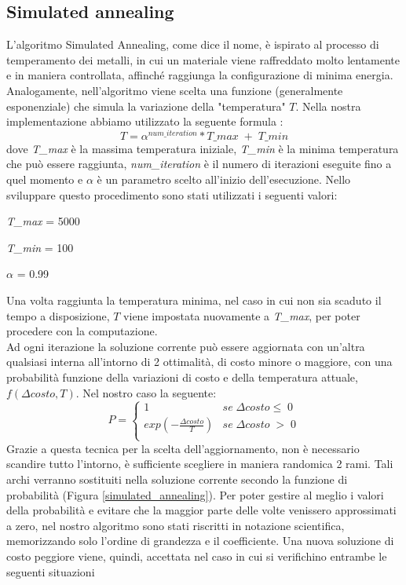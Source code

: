 \subsection{Simulated annealing}
L'algoritmo Simulated Annealing, come dice il nome, è ispirato al processo di temperamento dei metalli, in cui un materiale viene raffreddato molto lentamente e in maniera controllata, affinché raggiunga la configurazione di minima energia. Analogamente, nell'algoritmo viene scelta una funzione (generalmente esponenziale) che simula la variazione della "temperatura" $T$. Nella nostra implementazione abbiamo utilizzato la seguente formula \cite{SA}:
$$T = \alpha^{num\_iteration}* T\_max \;+\; T\_min$$
dove \textit{T\_max} è la massima temperatura iniziale, \textit{T\_min} è la minima temperatura che può essere raggiunta, \textit{num\_iteration} è il numero di iterazioni eseguite fino a quel momento e \textit{$\alpha$} è un parametro scelto all'inizio dell'esecuzione. Nello sviluppare questo procedimento sono stati utilizzati i seguenti valori:
\begin{itemize}
\begin{multicols}{3}
\item{\textit{T\_max} = 5000}
\item{\textit{T\_min} = 100}
\item{\textit{$\alpha$} = 0.99}
\end{multicols}
\end{itemize}
Una volta raggiunta la temperatura minima, nel caso in cui non sia scaduto il tempo a disposizione, $T$ viene impostata nuovamente a \textit{T\_max}, per poter procedere con la computazione.\\ 
 Ad ogni iterazione la soluzione corrente può essere aggiornata con un'altra qualsiasi  interna all'intorno di 2 ottimalità, di costo minore o maggiore, con una probabilità funzione della variazioni di costo e della temperatura attuale, $f(\Delta costo, T)$. Nel nostro caso la seguente\cite{SA}:
$$P = 
\begin{cases}
1 & se\; \Delta costo \leq \;0\\
exp(- \frac{\Delta costo}{T}) & se\; \Delta costo \;>\;0\\
\end{cases}
$$
Grazie a questa tecnica per la scelta dell'aggiornamento, non è necessario scandire tutto l'intorno, è sufficiente scegliere in maniera randomica 2 rami. Tali archi verranno sostituiti nella soluzione corrente secondo la funzione di probabilità (Figura \ref{simulated_annealing}).
 Per poter gestire al meglio i valori della probabilità e evitare che la maggior parte delle volte venissero approssimati a zero, nel nostro algoritmo sono stati riscritti in notazione scientifica, memorizzando solo l'ordine di grandezza e il coefficiente. Una nuova soluzione di costo peggiore viene, quindi, accettata nel caso in cui si verifichino entrambe le seguenti situazioni 
